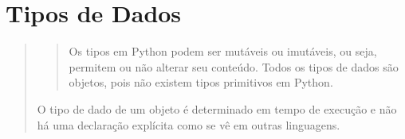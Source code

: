 \documentclass[letterpaper,10pt,brazil]{sphinxmanual}
\begin{document}
\begin{sphinxVerbatim}[commandchars=\\\{\}]
  

 
\end{sphinxVerbatim}

\begin{sphinxVerbatim}[commandchars=\\\{\}]
\end{sphinxVerbatim}

\begin{sphinxVerbatim}[commandchars=\\\{\}]
 
\end{sphinxVerbatim}

\begin{sphinxVerbatim}[commandchars=\\\{\}]
\end{sphinxVerbatim}

\begin{sphinxVerbatim}[commandchars=\\\{\}]
 
\end{sphinxVerbatim}

\begin{sphinxVerbatim}[commandchars=\\\{\}]
\end{sphinxVerbatim}


\chapter{Tipos de Dados}
\label{\detokenize{content/data_types:tipos-de-dados}}\label{\detokenize{content/data_types::doc}}\begin{quote}
\begin{quote}

Os tipos em Python podem ser mutáveis ou imutáveis, ou seja, permitem ou não alterar seu conteúdo.
Todos os tipos de dados são objetos, pois não existem tipos primitivos em Python.
\end{quote}

O tipo de dado de um objeto é determinado em tempo de execução e não há uma declaração explícita como se vê em outras linguagens.
\end{quote}
\end{document}
